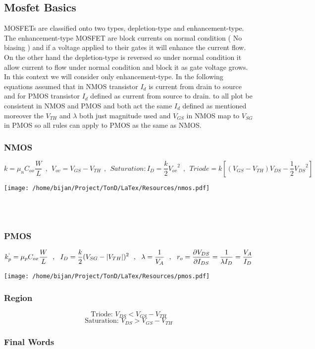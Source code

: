 \subsection{Mosfet Basics}
MOSFETs are classified onto two types, depletion-type and enhancement-type. The enhancement-type MOSFET are block currents on normal condition ( No biasing ) and if a voltage applied to their gates it will enhance the current flow. On the other hand the depletion-type is reversed so under normal condition it allow current to flow under normal condition and block it as gate voltage grows. In this context we will consider only enhancement-type. In the following equations assumed that in NMOS transistor $I_d$ is current from drain to source and for PMOS transistor $I_d$ defined as current from source to drain. to all plot be consistent in NMOS and PMOS and both act the same $I_d$ defined as mentioned moreover the $V_{TH}$ and $\lambda$ both just magnitude used and $V_{GS}$ in NMOS map to $V_{SG}$ in PMOS so all  rules can apply to PMOS as the same as NMOS.
\subsubsection{NMOS}
$$ k = {\mu}_n C_{ox} \frac{W}{L} ~~ , ~~ V_{ov} = V_{GS} - V_{TH} ~~, ~~  Saturation: I_D = \frac{k}{2} {V_{ov}}^2 ~~,~~ Triode = k [(V_{GS} - V_{TH})V_{DS} - \frac{1}{2}{V_{DS}}^2]$$
\par
\begin{minipage}{\linewidth}
 \texttt{[image: /home/bijan/Project/TonD/LaTex/Resources/nmos.pdf]}
\centering
\end{minipage}
~\\
~\\
\subsubsection{PMOS}
$$ k^{`}_p = {\mu}_p C_{ox} \frac{W}{L} ~~, ~~ I_D = \frac{k}{2} (V_{SG} - |V_{TH}|)^2 ~~,~~ 
\lambda = \frac{1}{V_A} ~~, ~~ r_o = \frac{\partial V_{DS}}{\partial I_{DS}} = \frac{1}{\lambda  I_D} = \frac{V_A}{I_D}$$
\begin{minipage}{\linewidth}
\texttt{[image: /home/bijan/Project/TonD/LaTex/Resources/pmos.pdf]}
\centering
\end{minipage}
\subsubsection{Region}
$$ \text{Triode:~} V_{DS} < V_{GS} - V_{TH} $$
$$ \text{Saturation:~} V_{DS} > V_{GS} - V_{TH} $$
\subsubsection{Final Words}
\lipsum[60-61]
